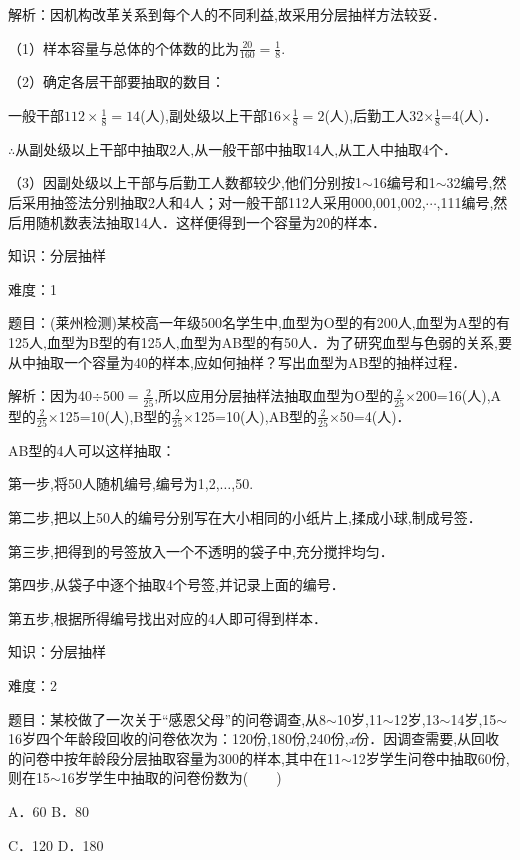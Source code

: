 \documentclass{article} %
\begin{document}
解析：因机构改革关系到每个人的不同利益,故采用分层抽样方法较妥．

（1）样本容量与总体的个体数的比为$\frac{20}{160}=\frac{1}{8}$.

（2）确定各层干部要抽取的数目：

一般干部$112\times\frac{1}{8}=14$(人),副处级以上干部$16\mathrm{\times}\frac{1}{8}=2$(人),后勤工人32$\mathrm{\times}\frac{1}{8}$=4(人)．

$\mathrm{\therefore}$从副处级以上干部中抽取2人,从一般干部中抽取14人,从工人中抽取4个．

（3）因副处级以上干部与后勤工人数都较少,他们分别按1$\sim$16编号和1$\sim$32编号,然后采用抽签法分别抽取2人和4人；对一般干部112人采用000,001,002,$\cdots$,111编号,然后用随机数表法抽取14人．这样便得到一个容量为20的样本．

知识：分层抽样

难度：1

题目：(莱州检测)某校高一年级500名学生中,血型为O型的有200人,血型为A型的有125人,血型为B型的有125人,血型为AB型的有50人．为了研究血型与色弱的关系,要从中抽取一个容量为40的样本,应如何抽样？写出血型为AB型的抽样过程．

解析：因为40$\mathrm{\div}500=\frac{2}{25}$,所以应用分层抽样法抽取血型为O型的$\frac{2}{25}\mathrm{\times}$200=16(人),A型的$\frac{2}{25}\mathrm{\times}$125=10(人),B型的$\frac{2}{25}\mathrm{\times}$125=10(人),AB型的$\frac{2}{25}\mathrm{\times}$50=4(人)．

AB型的4人可以这样抽取：

第一步,将50人随机编号,编号为1,2,$\dots$,50.

第二步,把以上50人的编号分别写在大小相同的小纸片上,揉成小球,制成号签．

第三步,把得到的号签放入一个不透明的袋子中,充分搅拌均匀．

第四步,从袋子中逐个抽取4个号签,并记录上面的编号．

第五步,根据所得编号找出对应的4人即可得到样本．




知识：分层抽样

难度：2

题目：某校做了一次关于``感恩父母''的问卷调查,从8$\sim$10岁,11$\sim$12岁,13$\sim$14岁,15$\sim$16岁四个年龄段回收的问卷依次为：120份,180份,240份,\textit{x}份．因调查需要,从回收的问卷中按年龄段分层抽取容量为300的样本,其中在11$\sim$12岁学生问卷中抽取60份,则在15$\sim$16岁学生中抽取的问卷份数为(　　)

A．60   B．80

C．120  D．180
\end{document}
